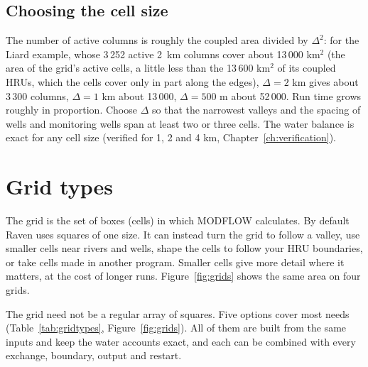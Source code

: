 \subsection{Choosing the cell size}
The number of active columns is roughly the coupled area divided by $\Delta^2$: for the Liard example, whose 3\,252 active 2~km columns cover about 13\,000 km$^2$ (the area of the grid's
active cells, a little less than the 13\,600 km$^2$ of its coupled HRUs, which the cells cover only in part along the edges),
$\Delta=2$ km gives about 3\,300 columns, $\Delta=1$ km about 13\,000, $\Delta=500$ m about 52\,000. Run time grows roughly in
proportion. Choose $\Delta$ so that the narrowest valleys and the spacing of wells and monitoring wells span at least two or
three cells. The water balance is exact for any cell size (verified for 1, 2 and 4 km, Chapter~\ref{ch:verification}).

\section{Grid types}\label{sec:gridtypes}
\begin{plain}
The grid is the set of boxes (cells) in which MODFLOW calculates. By default Raven uses squares of one size. It can instead
turn the grid to follow a valley, use smaller cells near rivers and wells, shape the cells to follow your HRU boundaries, or
take cells made in another program. Smaller cells give more detail where it matters, at the cost of longer runs.
Figure~\ref{fig:grids} shows the same area on four grids.
\end{plain}
The grid need not be a regular array of squares. Five options cover most needs (Table~\ref{tab:gridtypes},
Figure~\ref{fig:grids}). All of them are built from the same inputs and keep the water accounts exact, and each can be
combined with every exchange, boundary, output and restart.

